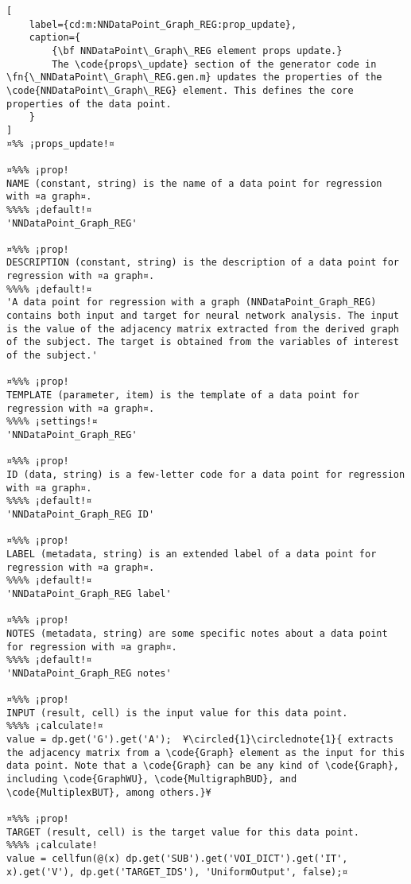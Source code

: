 \documentclass{tufte-handout}
\begin{document}
\begin{lstlisting}[
	label={cd:m:NNDataPoint_Graph_REG:prop_update},
	caption={
		{\bf NNDataPoint\_Graph\_REG element props update.}
		The \code{props\_update} section of the generator code in \fn{\_NNDataPoint\_Graph\_REG.gen.m} updates the properties of the \code{NNDataPoint\_Graph\_REG} element. This defines the core properties of the data point.
	}
]
¤%% ¡props_update!¤

¤%%% ¡prop!
NAME (constant, string) is the name of a data point for regression with ¤a graph¤.
%%%% ¡default!¤
'NNDataPoint_Graph_REG'

¤%%% ¡prop!
DESCRIPTION (constant, string) is the description of a data point for regression with ¤a graph¤.
%%%% ¡default!¤
'A data point for regression with a graph (NNDataPoint_Graph_REG) contains both input and target for neural network analysis. The input is the value of the adjacency matrix extracted from the derived graph of the subject. The target is obtained from the variables of interest of the subject.'

¤%%% ¡prop!
TEMPLATE (parameter, item) is the template of a data point for regression with ¤a graph¤.
%%%% ¡settings!¤
'NNDataPoint_Graph_REG'

¤%%% ¡prop!
ID (data, string) is a few-letter code for a data point for regression with ¤a graph¤.
%%%% ¡default!¤
'NNDataPoint_Graph_REG ID'

¤%%% ¡prop!
LABEL (metadata, string) is an extended label of a data point for regression with ¤a graph¤.
%%%% ¡default!¤
'NNDataPoint_Graph_REG label'

¤%%% ¡prop!
NOTES (metadata, string) are some specific notes about a data point for regression with ¤a graph¤.
%%%% ¡default!¤
'NNDataPoint_Graph_REG notes'

¤%%% ¡prop!
INPUT (result, cell) is the input value for this data point.
%%%% ¡calculate!¤
value = dp.get('G').get('A');  ¥\circled{1}\circlednote{1}{ extracts the adjacency matrix from a \code{Graph} element as the input for this data point. Note that a \code{Graph} can be any kind of \code{Graph}, including \code{GraphWU}, \code{MultigraphBUD}, and \code{MultiplexBUT}, among others.}¥
    
¤%%% ¡prop!
TARGET (result, cell) is the target value for this data point.
%%%% ¡calculate!
value = cellfun(@(x) dp.get('SUB').get('VOI_DICT').get('IT', x).get('V'), dp.get('TARGET_IDS'), 'UniformOutput', false);¤

\end{lstlisting}
\end{document}

